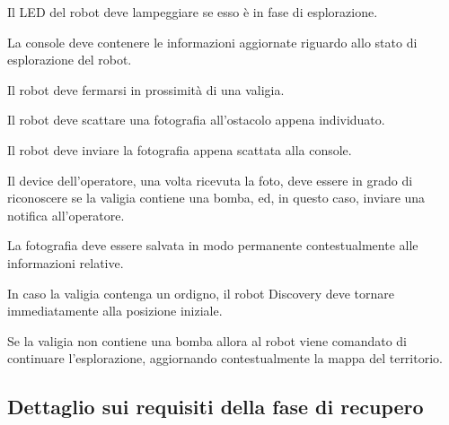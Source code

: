 \begin{description}[itemsep=1em]
  Il LED del robot deve lampeggiare se esso è in fase di esplorazione.

  \item[\requirementref{R-consoleUpdate}]

  La console deve contenere le informazioni aggiornate riguardo allo stato di esplorazione del robot.

  \item[\requirementref{R-stopAtBag}]

  Il robot deve fermarsi in prossimità di una valigia.

  \item[\requirementref{R-takePhoto}]

  Il robot deve scattare una fotografia all'ostacolo appena individuato.

  \item[\requirementref{R-sendPhoto}]

  Il robot deve inviare la fotografia appena scattata alla console.

  \item[\requirementref{R-alert}]

  Il device dell'operatore, una volta ricevuta la foto, deve essere in grado di riconoscere
  se la valigia contiene una bomba, ed, in questo caso, inviare una notifica all'operatore.

  \item[\requirementref{R-storePhoto}]

  La fotografia deve essere salvata in modo permanente contestualmente alle informazioni relative.

  \item[\requirementref{R-backHomeSinceBomb}]

  In caso la valigia contenga un ordigno, il robot Discovery deve tornare immediatamente alla posizione iniziale.

  \item[\requirementref{R-continueExploreAfterPhoto}]

  Se la valigia non contiene una bomba allora al robot viene comandato di continuare l'esplorazione, aggiornando contestualmente la mappa del territorio.
\end{description}

\subsection{Dettaglio sui requisiti della fase di recupero}

